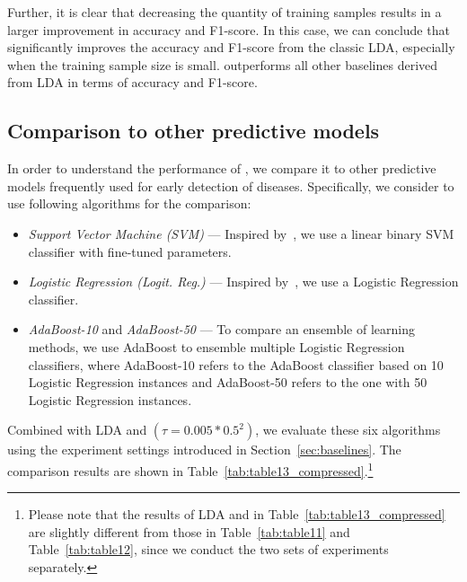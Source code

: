 Further, it is clear that decreasing the quantity of training samples results in a larger improvement in accuracy and F1-score. 
In this case, we can conclude that \TheName{} significantly improves the accuracy and F1-score from the classic LDA, especially when the training sample size is small. 
\TheName{} outperforms all other baselines derived from LDA in terms of accuracy and F1-score. 



\subsection{Comparison to other predictive models}
In order to understand the performance of \TheName{}, we compare it to other predictive models frequently used for early detection of diseases. 
Specifically, we consider to use following algorithms for the comparison:
\begin{itemize}
\item \emph{Support Vector Machine (SVM)} ---  Inspired by~\cite{xxx}, we use a linear binary SVM classifier with fine-tuned parameters.
\item \emph{Logistic Regression (Logit. Reg.)} --- Inspired by~\cite{xxx},  we use a Logistic Regression classifier.
\item \emph{AdaBoost-10} and \emph{AdaBoost-50} --- To compare an ensemble of learning methods, we use AdaBoost to ensemble multiple Logistic Regression classifiers, where AdaBoost-10 refers to the AdaBoost classifier based on 10 Logistic Regression instances and AdaBoost-50 refers to the one with 50 Logistic Regression instances.
\end{itemize}
Combined with LDA and \TheName{} $(\tau=0.005*0.5^2)$, we evaluate these six algorithms using the experiment settings introduced in Section~\ref{sec:baselines}. 
The comparison results are shown in Table~\ref{tab:table13_compressed}.\footnote{Please note that the results of LDA and \TheName{} in Table~\ref{tab:table13_compressed} are slightly different from those in Table~\ref{tab:table11} and Table~\ref{tab:table12}, since we conduct the two sets of experiments separately.}  

	

